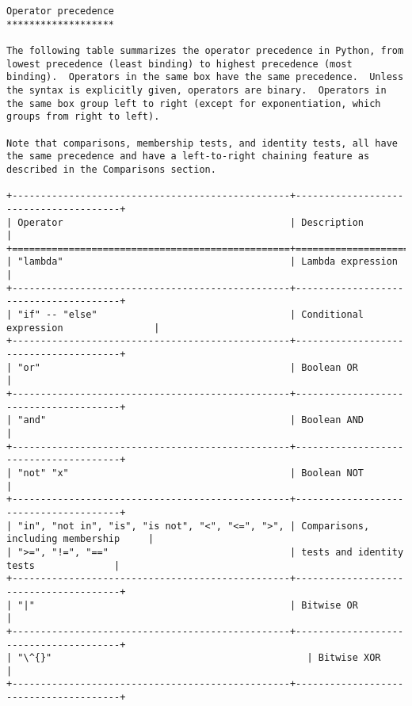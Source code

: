 \documentclass[11pt]{article}
\begin{document}
    \begin{Verbatim}[commandchars=\\\{\}]
Operator precedence
*******************

The following table summarizes the operator precedence in Python, from
lowest precedence (least binding) to highest precedence (most
binding).  Operators in the same box have the same precedence.  Unless
the syntax is explicitly given, operators are binary.  Operators in
the same box group left to right (except for exponentiation, which
groups from right to left).

Note that comparisons, membership tests, and identity tests, all have
the same precedence and have a left-to-right chaining feature as
described in the Comparisons section.

+-------------------------------------------------+---------------------------------------+
| Operator                                        | Description                           |
+=================================================+=======================================+
| "lambda"                                        | Lambda expression                     |
+-------------------------------------------------+---------------------------------------+
| "if" -- "else"                                  | Conditional expression                |
+-------------------------------------------------+---------------------------------------+
| "or"                                            | Boolean OR                            |
+-------------------------------------------------+---------------------------------------+
| "and"                                           | Boolean AND                           |
+-------------------------------------------------+---------------------------------------+
| "not" "x"                                       | Boolean NOT                           |
+-------------------------------------------------+---------------------------------------+
| "in", "not in", "is", "is not", "<", "<=", ">", | Comparisons, including membership     |
| ">=", "!=", "=="                                | tests and identity tests              |
+-------------------------------------------------+---------------------------------------+
| "|"                                             | Bitwise OR                            |
+-------------------------------------------------+---------------------------------------+
| "\^{}"                                             | Bitwise XOR                           |
+-------------------------------------------------+---------------------------------------+

\end{Verbatim}
\end{document}

